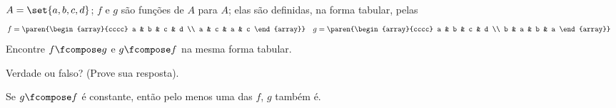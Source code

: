 \begin{exercise}
    $A = \set {a,b,c,d}$; $f$ e $g$ são funções de $A$ para $A$; elas são definidas, na forma tabular, pelas
    $$
    \begin{aligned}
        f &= \paren{\begin{array}{cccc} a & b & c & d \\ a & c & a & c \end{array}}
       &g &= \paren{\begin{array}{cccc} a & b & c & d \\ b & a & b & a \end{array}}
    \end{aligned}
    $$
    Encontre $f \fcompose g$ e $g \fcompose f$ na mesma forma tabular.
\end{exercise}

\begin{exercise}
    Verdade ou falso? (Prove sua resposta).

    Se $g \fcompose f$ é constante, então pelo menos uma das $f$, $g$ também é.
\end{exercise}
